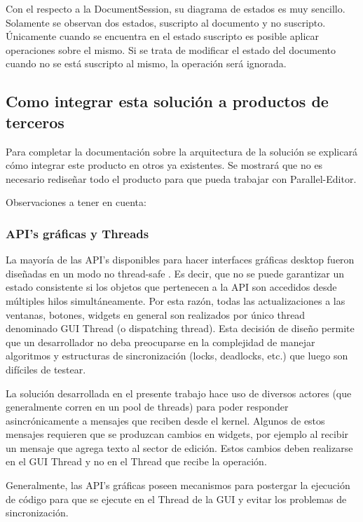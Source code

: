 \documentclass[12pt,a4paper]{article}
\begin{document}
Con el respecto a la DocumentSession, su diagrama de estados es muy sencillo. Solamente se observan dos estados, suscripto al
documento y no suscripto. Únicamente cuando se encuentra en el estado suscripto es posible aplicar operaciones sobre el mismo.
Si se trata de modificar el estado del documento cuando no se está suscripto al mismo, la operación será ignorada.

\subsection{Como integrar esta solución a productos de terceros}
Para completar la documentación sobre la arquitectura de la solución se explicará cómo integrar este producto en otros ya
existentes. Se mostrará que no es necesario rediseñar todo el producto para que pueda trabajar con Parallel-Editor.

Observaciones a tener en cuenta:

\subsubsection{API’s gráficas y Threads}

La mayoría de las API’s disponibles para hacer interfaces gráficas desktop fueron diseñadas en un 
modo no thread-safe \cite{threads-swing,threads-swt}. Es decir, que no se puede garantizar un estado 
consistente si los objetos que pertenecen a la API son accedidos desde múltiples hilos simultáneamente. 
Por esta razón, todas las actualizaciones a las ventanas, botones, widgets
en general son realizados por único thread denominado GUI Thread (o dispatching thread). Esta decisión de diseño permite que
un desarrollador no deba preocuparse en la complejidad de manejar algoritmos y estructuras de sincronización
(locks, deadlocks, etc.) que luego son difíciles de testear.

La solución desarrollada en el presente trabajo hace uso de diversos actores (que generalmente corren en un pool de threads) para poder 
responder asincrónicamente a mensajes que reciben desde el kernel. Algunos de estos mensajes requieren que se produzcan
cambios en widgets, por ejemplo al recibir un mensaje que agrega texto al sector de edición. Estos cambios deben realizarse en
el GUI Thread y no en el Thread que recibe la operación.

Generalmente, las API’s gráficas poseen mecanismos para postergar la ejecución de código para que se ejecute en el Thread de
la GUI \cite{swing-invoke-later,swt-async} y evitar los problemas de sincronización.
\end{document}
